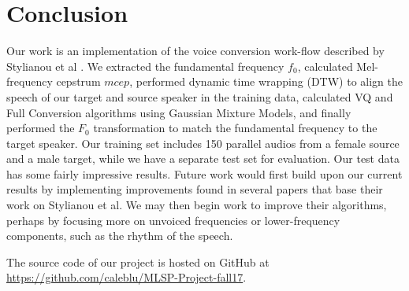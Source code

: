 \section{Conclusion}
\label{sec:conclusion}


Our work is an implementation of the voice conversion work-flow described by Stylianou et al \cite{stylianou1998continuous}. We extracted the fundamental frequency $f_0$, calculated Mel-frequency cepstrum $mcep$, performed dynamic time wrapping (DTW) to align the speech of our target and source speaker in the training data, calculated VQ and Full Conversion algorithms using Gaussian Mixture Models, and finally performed the $F_0$ transformation to match the fundamental frequency to the target speaker. Our training set includes 150 parallel audios from a female source and a male target, while we have a separate test set for evaluation. Our test data has some fairly impressive results. Future work would first build upon our current results by implementing improvements found in several papers that base their work on Stylianou et al. We may then begin work to improve their algorithms, perhaps by focusing more on unvoiced frequencies or lower-frequency components, such as the rhythm of the speech.

The source code of our project is hosted on GitHub at \url{https://github.com/caleblu/MLSP-Project-fall17}.

